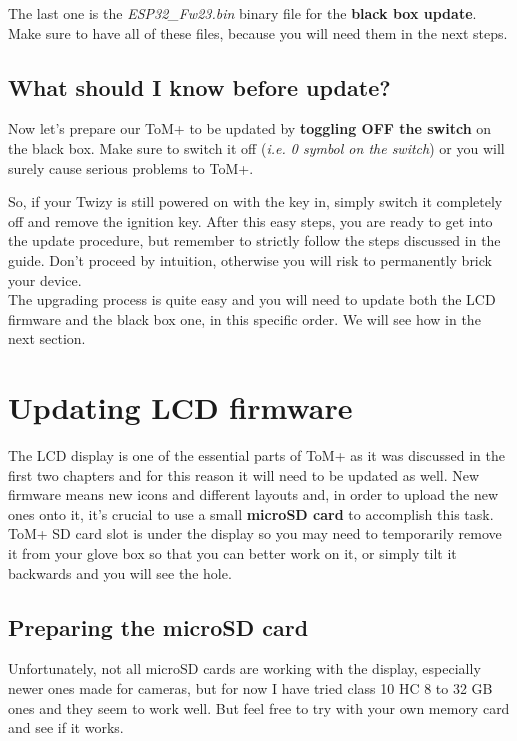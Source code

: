 The last one is the \textit{ESP32\_Fw23.bin} binary file for the \textbf{black box update}.
Make sure to have all of these files, because you will need them in the next steps.

\subsection{What should I know before update?}

Now let's prepare our ToM+ to be updated by \textbf{toggling OFF the switch} on the
black box. Make sure to switch it off (\textit{i.e. 0 symbol on the switch}) or you
will surely cause serious problems to ToM+.

So, if your Twizy is still powered on with the key in, simply switch it completely off
and remove the ignition key. After this easy steps, you are ready to get into the update
procedure, but remember to strictly follow the steps discussed in the guide. Don't
proceed by intuition, otherwise you will risk to permanently brick your device.\\

The upgrading process is quite easy and you will need to update both the LCD firmware
and the black box one, in this specific order. We will see how in the next section.



\section{Updating LCD firmware}

The LCD display is one of the essential parts of ToM+ as it was discussed in the first
two chapters and for this reason it will need to be updated as well. New firmware
means new icons and different layouts and, in order to upload the new ones onto it,
it's crucial to use a small \textbf{microSD card} to accomplish this task. ToM+ SD
card slot is under the display so you may need to temporarily remove it from your
glove box so that you can better work on it, or simply tilt it backwards and you 
will see the hole.

\subsection{Preparing the microSD card}

Unfortunately, not all microSD cards are working with the display, especially newer
ones made for cameras, but for now I have tried class 10 HC 8 to 32 GB ones and they
seem to work well. But feel free to try with your own memory card and see if it works.\\

